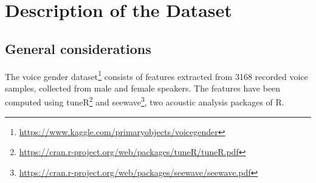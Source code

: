 
\chapter{Description of the Dataset}
\label{chap:dataset}

\section{General considerations}
\label{sec:gen_cons}
The voice gender dataset\footnote{\url{https://www.kaggle.com/primaryobjects/voicegender}} consists of features extracted from \num{3168} recorded voice samples, collected from male and female speakers. 
The features have been computed using tuneR\footnote{\url{https://cran.r-project.org/web/packages/tuneR/tuneR.pdf}} and seewave\footnote{\url{https://cran.r-project.org/web/packages/seewave/seewave.pdf}}, two acoustic analysis packages of R.

